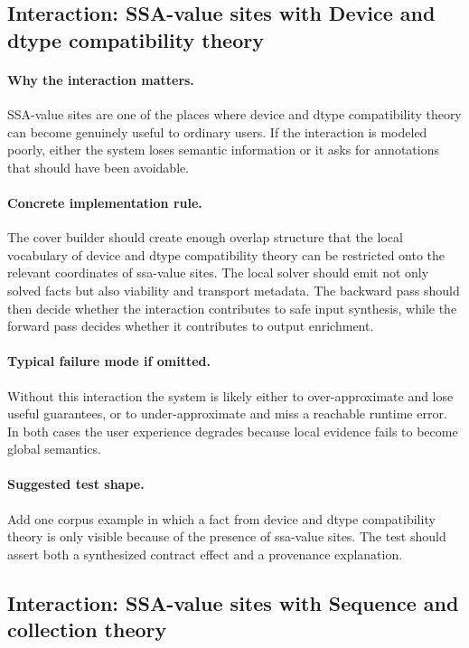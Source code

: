\documentclass[11pt]{report}
\theoremstyle{definition}
\theoremstyle{plain}
\begin{document}
\subsection{Interaction: SSA-value sites with Device and dtype compatibility theory}

\paragraph{Why the interaction matters.}
SSA-value sites are one of the places where device and dtype compatibility theory can become
genuinely useful to ordinary users. If the interaction is modeled poorly,
either the system loses semantic information or it asks for annotations that
should have been avoidable.

\paragraph{Concrete implementation rule.}
The cover builder should create enough overlap structure that the local
vocabulary of device and dtype compatibility theory can be restricted onto the relevant
coordinates of ssa-value sites. The local solver should emit not only
solved facts but also viability and transport metadata. The backward pass
should then decide whether the interaction contributes to safe input
synthesis, while the forward pass decides whether it contributes to output
enrichment.

\paragraph{Typical failure mode if omitted.}
Without this interaction the system is likely either to over-approximate and
lose useful guarantees, or to under-approximate and miss a reachable runtime
error. In both cases the user experience degrades because local evidence
fails to become global semantics.

\paragraph{Suggested test shape.}
Add one corpus example in which a fact from device and dtype compatibility theory is only
visible because of the presence of ssa-value sites. The test should
assert both a synthesized contract effect and a provenance explanation.

\subsection{Interaction: SSA-value sites with Sequence and collection theory}
\end{document}
